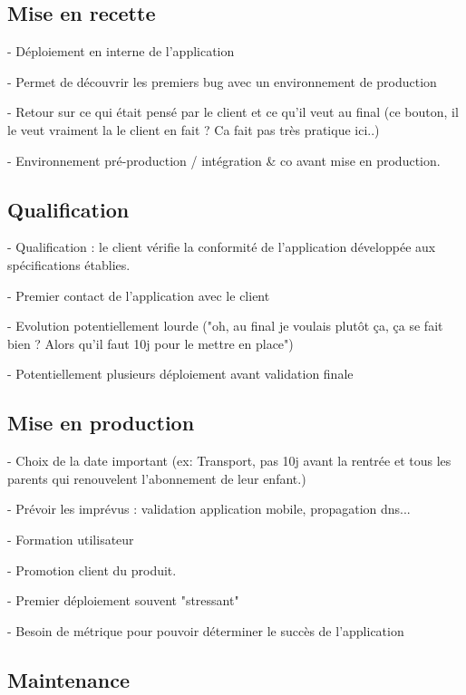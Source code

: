 \subsection{Mise en recette}

- Déploiement en interne de l'application

- Permet de découvrir les premiers bug avec un environnement de production

- Retour sur ce qui était pensé par le client et ce qu'il veut au final (ce bouton, il le veut vraiment la le client en fait ? Ca fait pas très pratique ici..)

- Environnement pré-production / intégration \& co avant mise en production.


\subsection{Qualification}

- Qualification : le client vérifie la conformité de l’application développée aux spécifications établies.

- Premier contact de l'application avec le client

- Evolution potentiellement lourde ("oh, au final je voulais plutôt ça, ça se fait bien ? Alors qu'il faut 10j pour le mettre en place")

- Potentiellement plusieurs déploiement avant validation finale

\subsection{Mise en production}

- Choix de la date important (ex: Transport, pas 10j avant la rentrée et tous les parents qui renouvelent l'abonnement de leur enfant.)

- Prévoir les imprévus : validation application mobile, propagation dns...

- Formation utilisateur

- Promotion client du produit.

- Premier déploiement souvent "stressant"

- Besoin de métrique pour pouvoir déterminer le succès de l'application


\subsection{Maintenance}

